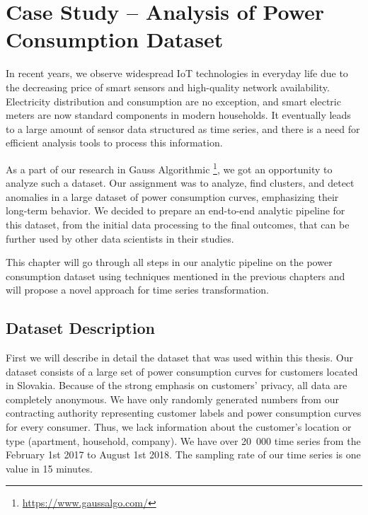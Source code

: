 \chapter{Case Study -- Analysis of Power Consumption Dataset}

In recent years, we observe widespread IoT technologies in everyday life due to the decreasing price of smart sensors and high-quality network availability. Electricity distribution and consumption are no exception, and smart electric meters are now standard components in modern households. It eventually leads to a large amount of sensor data structured as time series, and there is a need for efficient analysis tools to process this information. 

As a part of our research in Gauss Algorithmic \footnote{\url{https://www.gaussalgo.com/}}, we got an opportunity to analyze such a dataset. Our assignment was to analyze, find clusters, and detect anomalies in a large dataset of power consumption curves, emphasizing their long-term behavior. We decided to prepare an end-to-end analytic pipeline for this dataset, from the initial data processing to the final outcomes,  that can be further used by other data scientists in their studies.

This chapter will go through all steps in our analytic pipeline on the power consumption dataset using techniques mentioned in the previous chapters and will propose a novel approach for time series transformation.

\section{Dataset Description}
First we will describe in detail the dataset that was used within this thesis. Our dataset consists of a large set of power consumption curves for customers located in Slovakia. Because of the strong emphasis on customers' privacy, all data are completely anonymous. We have only randomly generated numbers from our contracting authority representing customer labels and power consumption curves for every consumer. Thus, we lack information about the customer's location or type (apartment, household, company). We have over 20~000 time series from the February 1st 2017 to August 1st 2018. The sampling rate of our time series is one value in 15 minutes.

